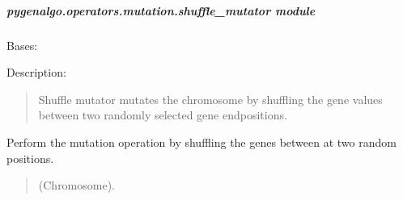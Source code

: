 \documentclass[letterpaper,10pt,english]{sphinxmanual}
\begin{document}
\subparagraph{pygenalgo.operators.mutation.shuffle\_mutator module}
\label{\detokenize{pygenalgo.operators.mutation:module-pygenalgo.operators.mutation.shuffle_mutator}}\label{\detokenize{pygenalgo.operators.mutation:pygenalgo-operators-mutation-shuffle-mutator-module}}

\begin{fulllineitems}
\label{\detokenize{pygenalgo.operators.mutation:pygenalgo.operators.mutation.shuffle_mutator.ShuffleMutator}}
\pysigstartsignatures
{}
\pysigstopsignatures
\sphinxAtStartPar
Bases: {\hyperref[\detokenize{pygenalgo.operators.mutation:pygenalgo.operators.mutation.mutate_operator.MutationOperator}]{}}

\sphinxAtStartPar
Description:
\begin{quote}

\sphinxAtStartPar
Shuffle mutator mutates the chromosome by shuffling the gene
values between two randomly selected gene end\sphinxhyphen{}positions.
\end{quote}

\begin{fulllineitems}
\label{\detokenize{pygenalgo.operators.mutation:pygenalgo.operators.mutation.shuffle_mutator.ShuffleMutator.mutate}}
\pysigstartsignatures
{}
\pysigstopsignatures
\sphinxAtStartPar
Perform the mutation operation by shuffling the genes
between at two random positions.
\begin{quote}\begin{description}
\sphinxAtStartPar
{} \textendash{} (Chromosome).


\end{description}
\end{quote}
\end{fulllineitems}
\end{fulllineitems}
\end{document}
